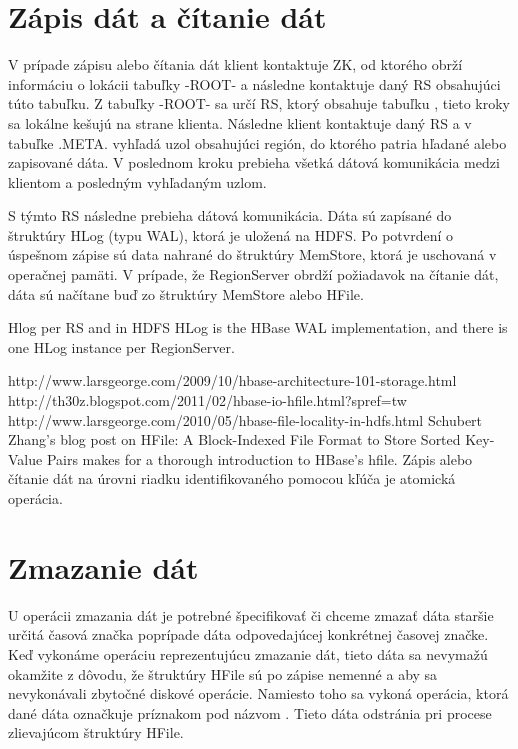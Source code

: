 \documentclass[11pt,twoside,a4paper]{book}
\begin{document}
\section{Zápis dát a čítanie dát}

V prípade zápisu alebo čítania dát klient kontaktuje ZK, od ktorého obrží informáciu o lokácii tabuľky -ROOT- a následne kontaktuje daný RS obsahujúci túto tabuľku. Z tabuľky -ROOT- sa určí RS, ktorý obsahuje tabuľku , tieto kroky sa lokálne kešujú na strane klienta. Následne klient kontaktuje daný RS a v tabuľke .META. vyhľadá uzol obsahujúci región, do ktorého patria hľadané alebo zapisované dáta. V poslednom kroku prebieha všetká dátová komunikácia medzi klientom a posledným vyhľadaným uzlom.

S týmto RS následne prebieha dátová komunikácia. Dáta sú zapísané do štruktúry HLog (typu WAL), ktorá je uložená na HDFS. Po potvrdení o úspešnom zápise sú data nahrané do štruktúry MemStore, ktorá je uschovaná v operačnej pamäti. V  prípade, že RegionServer obrdží požiadavok na čítanie dát, dáta sú načítane buď zo štruktúry MemStore alebo HFile.

Hlog per RS and in HDFS
HLog is the HBase WAL implementation, and there is one HLog instance per RegionServer.

http://www.larsgeorge.com/2009/10/hbase-architecture-101-storage.html
http://th30z.blogspot.com/2011/02/hbase-io-hfile.html?spref=tw
http://www.larsgeorge.com/2010/05/hbase-file-locality-in-hdfs.html
Schubert Zhang's blog post on HFile: A Block-Indexed File Format to Store Sorted Key-Value Pairs makes for a thorough introduction to HBase's hfile.
Zápis alebo čítanie dát na úrovni riadku identifikovaného pomocou kľúča je atomická operácia. 
\section{Zmazanie dát}

U operácii zmazania dát je potrebné špecifikovať či chceme zmazať dáta staršie určitá časová značka poprípade dáta odpovedajúcej konkrétnej časovej značke. Keď vykonáme operáciu reprezentujúcu zmazanie dát, tieto dáta sa nevymažú okamžite z dôvodu, že štruktúry HFile sú po zápise nemenné a aby sa nevykonávali zbytočné diskové operácie. Namiesto toho sa vykoná operácia, ktorá dané dáta označkuje príznakom pod názvom . Tieto dáta odstránia pri procese zlievajúcom štruktúry HFile.


\end{document}
